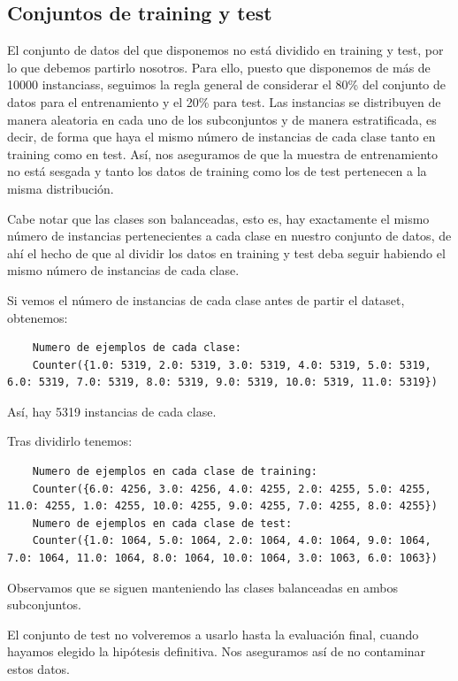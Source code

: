\documentclass[a4]{article}
\begin{document}
\subsection{Conjuntos de training y test}

El conjunto de datos del que disponemos no está dividido en training y test, por lo que debemos partirlo nosotros. Para ello, puesto que disponemos de más de 10000 instanciass, seguimos la regla general de considerar el 80\% del conjunto de datos para el entrenamiento y el 20\% para test. Las instancias se distribuyen de manera aleatoria en cada uno de los subconjuntos y de manera estratificada, es decir, de forma que haya el mismo número de instancias de cada clase tanto en training como en test.  Así, nos aseguramos de que la muestra de entrenamiento no está sesgada y tanto los datos de training como los de test pertenecen a la misma distribución.

Cabe notar que las clases son balanceadas, esto es, hay exactamente el mismo número de instancias pertenecientes a cada clase en nuestro conjunto de datos, de ahí el hecho de que al dividir los datos en training y test deba seguir habiendo el mismo número de instancias de cada clase. 

Si vemos el número de instancias de cada clase antes de partir el dataset, obtenemos: 

\begin{lstlisting}
	Numero de ejemplos de cada clase:
	Counter({1.0: 5319, 2.0: 5319, 3.0: 5319, 4.0: 5319, 5.0: 5319, 6.0: 5319, 7.0: 5319, 8.0: 5319, 9.0: 5319, 10.0: 5319, 11.0: 5319})
\end{lstlisting}

Así, hay 5319 instancias de cada clase.

Tras dividirlo tenemos:

\begin{lstlisting}
	Numero de ejemplos en cada clase de training:
	Counter({6.0: 4256, 3.0: 4256, 4.0: 4255, 2.0: 4255, 5.0: 4255, 11.0: 4255, 1.0: 4255, 10.0: 4255, 9.0: 4255, 7.0: 4255, 8.0: 4255})
	Numero de ejemplos en cada clase de test:
	Counter({1.0: 1064, 5.0: 1064, 2.0: 1064, 4.0: 1064, 9.0: 1064, 7.0: 1064, 11.0: 1064, 8.0: 1064, 10.0: 1064, 3.0: 1063, 6.0: 1063})
\end{lstlisting}

Observamos que se siguen manteniendo las clases balanceadas en ambos subconjuntos. 

El conjunto de test no volveremos a usarlo hasta la evaluación final, cuando hayamos elegido la hipótesis definitiva. Nos aseguramos así de no contaminar estos datos. 
\end{document}
